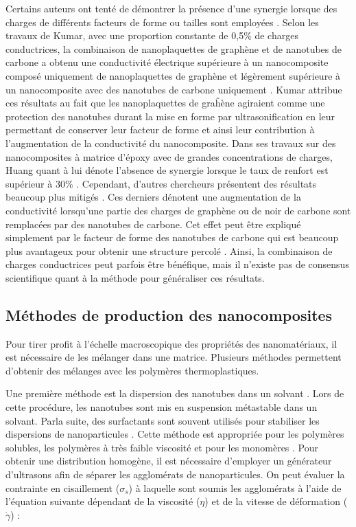 Certains auteurs ont tenté de démontrer la présence d'une synergie lorsque des charges de différents facteurs de forme ou tailles sont employées \cite{Kumar2010,Huang2012a,Dweiri2015,Wei2010,Safdari2012}.
Selon les travaux de Kumar, avec une proportion constante de 0,5\% de charges conductrices, la combinaison de nanoplaquettes de graphène et de nanotubes de carbone a obtenu une conductivité électrique supérieure à un nanocomposite composé uniquement de nanoplaquettes de graphène et légèrement supérieure à un nanocomposite avec des nanotubes de carbone uniquement \cite{Kumar2010}. 
Kumar attribue ces résultats au fait que les nanoplaquettes de graĥène agiraient comme une protection des nanotubes durant la mise en forme par ultrasonification en leur permettant de conserver leur facteur de forme et ainsi leur contribution à l'augmentation de la conductivité du nanocomposite. 
Dans ses travaux sur des nanocomposites à matrice d'époxy avec de grandes concentrations de charges, Huang quant à lui dénote l'absence de synergie lorsque le taux de renfort est supérieur à 30\% \cite{Huang2012a}. 
Cependant, d'autres chercheurs présentent des résultats beaucoup plus mitigés \cite{Dweiri2015,Wei2010}. 
Ces derniers dénotent une augmentation de la conductivité lorsqu'une partie des charges de graphène ou de noir de carbone sont remplacées par des nanotubes de carbone. 
Cet effet peut être expliqué simplement par le facteur de forme des nanotubes de carbone qui est beaucoup plus avantageux pour obtenir une structure percolé \cite{Safdari2012}. 
Ainsi, la combinaison de charges conductrices peut parfois être bénéfique, mais il n'existe pas de consensus scientifique quant à la méthode pour généraliser ces résultats. 

\subsection{Méthodes de production des nanocomposites}

Pour tirer profit à l'échelle macroscopique des propriétés des nanomatériaux, il est nécessaire de les mélanger dans une matrice. 
Plusieurs méthodes permettent d'obtenir des mélanges avec les polymères thermoplastiques. 

Une première méthode est la dispersion des nanotubes dans un solvant \cite{Mohammad2006}.
Lors de cette procédure, les nanotubes sont mis en suspension métastable dans un solvant. 
Parla suite, des surfactants sont souvent utilisés pour stabiliser les dispersions de nanoparticules \cite{Huang2012}. 
Cette méthode est appropriée pour les polymères solubles, les polymères à très faible viscosité et pour les monomères \cite{Ma2010}. 
Pour obtenir une distribution homogène, il est nécessaire d'employer un générateur d'ultrasons afin de séparer les agglomérats de nanoparticules. 
On peut évaluer la contrainte en cisaillement ($\sigma_s$) à laquelle sont soumis les agglomérats à l'aide de l'équation suivante dépendant de la viscosité ($\eta$) et de la vitesse de déformation ($\dot{\gamma}$) : 


